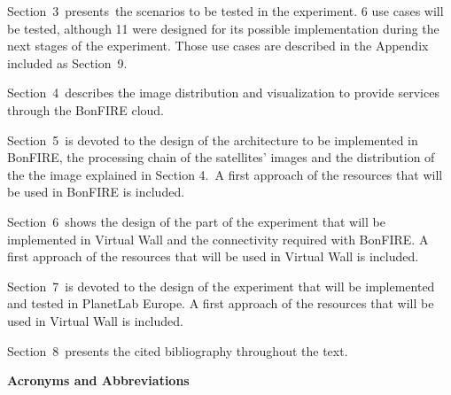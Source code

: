 \documentclass[a4paper]{article}
\begin{document}
\bigskip

Section\ 3\ presents\ the scenarios to be tested in the experiment. 6
use cases will be tested, although 11 were designed for its possible
implementation during the next stages of the experiment. Those use
cases are described in the Appendix included as Section\ 9.


\bigskip

Section\ 4\ describes the image distribution and visualization to
provide services through the BonFIRE cloud.


\bigskip

Section\ 5\ is devoted to the design of the architecture to be
implemented in BonFIRE, the processing chain of the
satellites{\textquoteright} images and the distribution of the the
image explained in Section 4.\ A first approach of the resources that
will be used in BonFIRE is included.


\bigskip

Section\ 6\ shows the design of the part of the experiment that will be
implemented in Virtual Wall and the connectivity required with BonFIRE.
A first approach of the resources that will be used in Virtual Wall is
included.


\bigskip

Section\ 7\ is devoted to the design of the experiment that will be
implemented and tested in PlanetLab Europe. A first approach of the
resources that will be used in Virtual Wall is included.


\bigskip

Section\ 8\ presents the cited bibliography throughout the text.


\bigskip

\clearpage
\textrm{\textbf{A}}\textrm{\textbf{cronyms and
A}}\textrm{\textbf{bbreviations}}


\bigskip
\end{document}
